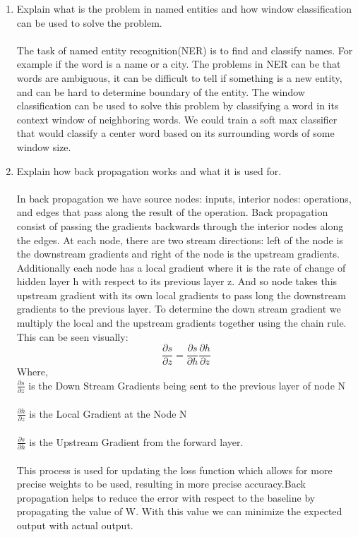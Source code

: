 \documentclass[12pt]{article}
\begin{document}
\begin{enumerate}
    \item Explain what is the problem in named entities and how window classification can be used to solve the problem.\\\\
    The task of named entity recognition(NER) is to find and classify names. For example if the word is a name or a city. The problems in NER can be that words are ambiguous, it can be difficult to tell if something is a new entity, and can be hard to determine boundary of the entity. The window classification can be used to solve this problem by classifying a word in its context window of neighboring words. We could train a soft max classifier that would classify a center word based on its surrounding words of some window size. 
    
    \item Explain how back propagation works and what it is used for. \\\\
    
    In back propagation we have source nodes: inputs, interior nodes: operations, and edges that pass along the result of the operation. Back propagation consist of passing the gradients backwards through the interior nodes along the edges. At each node, there are two stream directions: left of the node is the downstream gradients and right of the node is the upstream gradients. Additionally each node has a local gradient where it is the rate of change of hidden layer h with respect to its previous layer z. And so node takes this upstream gradient with its own local gradients to pass long the downstream gradients to the previous layer. To determine the down stream gradient we multiply the local and the upstream gradients together using the chain rule. This can be seen visually: 
   $$
\frac{\partial s}{\partial z} = \frac{\partial s}{\partial h}\frac{\partial h}{\partial z}
$$
Where, \\
 $\frac{\partial s}{\partial z} $ is the Down Stream Gradients being sent to the previous layer of node N\\\\
 $ \frac{\partial h}{\partial z}$ is the Local Gradient at the Node N \\\\
 $\frac{\partial s}{\partial h}$ is the Upstream Gradient from the forward layer. \\\\
 
This process is used for updating the loss function which allows for more precise weights to be used, resulting in more precise accuracy.Back propagation helps to reduce the error with respect to the baseline by propagating the value of W. With this value we can minimize the expected output with actual output. 
    

\end{enumerate}
\end{document}
